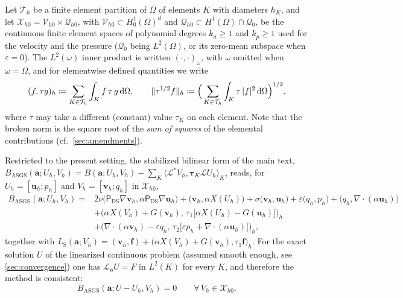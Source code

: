 \documentclass[11pt,a4paper]{article}
\newcommand{\ba}{\boldsymbol{a}}
\newcommand{\bff}{\boldsymbol{f}}
\newcommand{\buh}{\boldsymbol{u}_h}
\newcommand{\bvh}{\boldsymbol{v}_h}
\newcommand{\ViscProj}{\mathsf{P}_{\mathrm{DS}}}
\newcommand{\Th}{\mathcal{T}_h}
\newcommand{\Xh}{\mathcal{X}_{h0}}
\newcommand{\LS}{L_{\mathrm{S}}}
\newcommand{\X}{X}
\newcommand{\dd}{\,\mathrm{d}}
\DeclarePairedDelimiter{\norm}{\lVert}{\rVert}
\theoremstyle{plain}
\theoremstyle{remark}
\theoremstyle{definition}
\numberwithin{equation}{section}
\begin{document}
Let $\Th$ be a finite element partition of $\overline{\Omega}$ of elements $K$ with
diameters $h_K$, and let
$\Xh = \mathcal{V}_{h0}\times\mathcal{Q}_{h0}$, with
$\mathcal{V}_{h0}\subset H_0^1(\Omega)^d$ and
$\mathcal{Q}_{h0}\subset H^1(\Omega)\cap\mathcal{Q}_0$, be the continuous finite element
spaces of polynomial degrees $k_u\ge 1$ and $k_p\ge 1$ used for the velocity and the
pressure ($\mathcal{Q}_0$ being $L^2(\Omega)$, or its zero-mean subspace when
$\varepsilon=0$). The $L^2(\omega)$ inner product is written
$(\cdot,\cdot)_\omega$, with $\omega$ omitted when $\omega=\Omega$, and for elementwise
defined quantities we write
\begin{equation}\label{eq:brokennotation}
  (f,\tau g)_h \coloneqq \sum_{K\in\Th}\int_K f\,\tau\, g \dd\Omega,
  \qquad
  \norm{\tau^{1/2} f}_h \coloneqq \Bigl(\,\sum_{K\in\Th}\int_K \tau\, |f|^2
  \dd\Omega\Bigr)^{1/2},
\end{equation}
where $\tau$ may take a different (constant) value $\tau_K$ on each element. Note that the
broken norm is the square root of the \emph{sum of squares} of the elemental contributions
(cf.\ \cref{sec:amendments}).

Restricted to the present setting, the stabilized bilinear form of the main text,
$B_{\mathrm{ASGS}}(\ba; U_h,V_h)=B(\ba; U_h,V_h)-\sum_K \langle \mathcal{L}^* V_h,
\boldsymbol{\tau}_K \mathcal{L} U_h\rangle_K$, reads, for
$U_h=[\buh;p_h]$ and $V_h=[\bvh;q_h]$ in $\Xh$,
\begin{equation}\label{eq:Bstab}
\begin{aligned}
  B_{\mathrm{ASGS}}(\ba; U_h,V_h)
  ={}& 2\nu\bigl(\ViscProj\nabla\bvh,\alpha\ViscProj\nabla\buh\bigr)
     + \bigl(\bvh,\alpha\X(U_h)\bigr)
     + \sigma\bigl(\bvh,\buh\bigr)
     + \varepsilon\bigl(q_h,p_h\bigr)
     + \bigl(q_h,\nabla\cdot(\alpha\buh)\bigr) \\
   & + \bigl(\alpha\X(V_h)+G(\bvh),\,
       \tau_1\bigl[\alpha\X(U_h)-G(\buh)\bigr]\bigr)_h \\
   & + \bigl(\nabla\cdot(\alpha\bvh)-\varepsilon q_h,\,
       \tau_2\bigl[\varepsilon p_h+\nabla\cdot(\alpha\buh)\bigr]\bigr)_h ,
\end{aligned}
\end{equation}
together with
$\LS(\ba;V_h)=(\bvh,\bff)
 +\bigl(\alpha\X(V_h)+G(\bvh),\tau_1\bff\bigr)_h$.
For the exact solution $U$ of the linearized continuous problem (assumed smooth enough,
see \cref{sec:convergence}) one has $\mathcal{L}_{\ba}U=F$ in $L^2(K)$ for every $K$, and
therefore the method is consistent:
\begin{equation}\label{eq:consistency}
  B_{\mathrm{ASGS}}(\ba; U-U_h, V_h) = 0 \qquad \forall\, V_h\in\Xh .
\end{equation}
\end{document}
